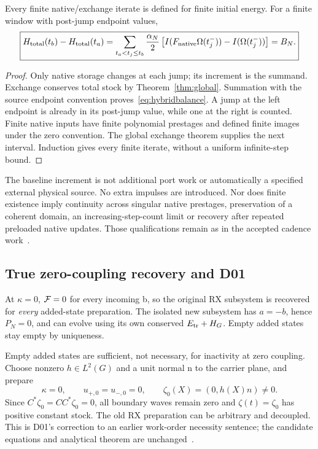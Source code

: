 \begin{proposition}\label{prop:hybrid}
Every finite native/exchange iterate is defined for finite initial energy. For a finite window with post-jump endpoint values,
\begin{equation}\label{eq:hybridbalance}
\boxed{H_{\rm total}(t_b)-H_{\rm total}(t_a)
=\sum_{t_a<t_j\le t_b}\frac{\alpha_N}{2}
\left[I(F_{\rm native}\Omega(t_j^-))-I(\Omega(t_j^-))\right]=B_N.}
\end{equation}
\end{proposition}
\begin{proof}
Only native storage changes at each jump; its increment is the summand. Exchange conserves total stock by Theorem~\ref{thm:global}. Summation with the source endpoint convention proves~\eqref{eq:hybridbalance}. A jump at the left endpoint is already in its post-jump value, while one at the right is counted. Finite native inputs have finite polynomial prestages and defined finite images under the zero convention. The global exchange theorem supplies the next interval. Induction gives every finite iterate, without a uniform infinite-step bound.
\end{proof}

The baseline increment is not additional port work or automatically a specified external physical source. No extra impulses are introduced. Nor does finite existence imply continuity across singular native prestages, preservation of a coherent domain, an increasing-step-count limit or recovery after repeated preloaded native updates. Those qualifications remain as in the accepted cadence work~\cite{CAD}.

\subsection{True zero-coupling recovery and D01}
At $\kappa=0$, $\mathcal F=0$ for every incoming b, so the original RX subsystem is recovered for \emph{every} added-state preparation. The isolated new subsystem has $a=-b$, hence $P_N=0$, and can evolve using its own conserved $E_{\rm tr}+H_G$. Empty added states stay empty by uniqueness.

\begin{remark}\label{rem:D01}
Empty added states are sufficient, not necessary, for inactivity at zero coupling. Choose nonzero $h\in L^2(G)$ and a unit normal n to the carrier plane, and prepare
\begin{equation}\label{eq:inactivekernel}
\kappa=0,\qquad u_{+,0}=u_{-,0}=0,\qquad \zeta_0(X)=(0,h(X)n)\ne0.
\end{equation}
Since $C^*\zeta_0=CC^*\zeta_0=0$, all boundary waves remain zero and $\zeta(t)=\zeta_0$ has positive constant stock. The old RX preparation can be arbitrary and decoupled. This is D01's correction to an earlier work-order necessity sentence; the candidate equations and analytical theorem are unchanged~\cite{Treview}.
\end{remark}

